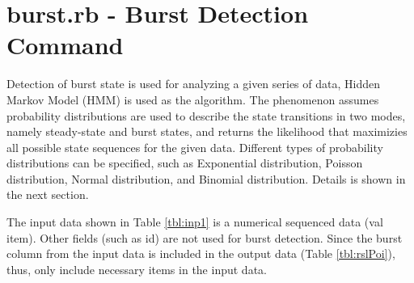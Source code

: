 




\section{burst.rb - Burst Detection Command\label{sect:burst}} 


Detection of burst state is used for analyzing a given series of data, Hidden Markov Model (HMM) is used as the algorithm. 
The phenomenon assumes probability distributions are used to describe the state transitions in two modes, namely steady-state and burst states, and returns the likelihood that maximizies all possible state sequences for the given data.
Different types of probability distributions can be specified, such as Exponential distribution, Poisson distribution, Normal distribution, and Binomial distribution. Details is shown in the next section.

The input data shown in Table \ref{tbl:inp1} is a numerical sequenced data (val item).
Other fields (such as id)  are not used for burst detection.
Since the burst column from the input data is included in the output data (Table \ref{tbl:rslPoi}), thus, only include necessary items in the input data.

